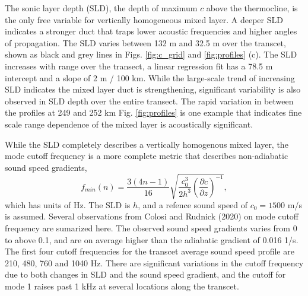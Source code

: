 \documentclass[preprint,NumberedRefs]{JASA}
\begin{document}
The sonic layer depth (SLD), the depth of maximum $c$ above the thermocline, is the only free variable for vertically homogeneous mixed layer. A deeper SLD indicates a stronger duct that traps lower acoustic frequencies and higher angles of propagation. The SLD varies between 132 m and 32.5 m over the transcet, shown as black and grey lines in Figs. \ref{fig:c_grid} and \ref{fig:profiles} (c). The SLD increases with range over the transect, a linear regression fit has a 78.5 m intercept and a slope of 2 m / 100 km. While the large-scale trend of increasing SLD indicates the mixed layer duct is strengthening, significant variability is also observed in SLD depth over the entire transect. The rapid variation in between the profiles at 249 and 252 km Fig. \ref{fig:profiles} is one example that indicates fine scale range dependence of the mixed layer is acoustically significant.

While the SLD completely describes a vertically homogenous mixed layer, the mode cutoff frequency\citep{Urick1982Prop} is a more complete metric that describes non-adiabatic sound speed gradients,
\begin{equation}
    f_{min}(n) = \frac{3(4n-1)}{16} \sqrt{\frac{c_0^3}{2h^3} \left( \frac{\partial c}{\partial z} \right) ^ {-1}},
    \label{eq:f_cutoff}
\end{equation}
which has units of Hz. The SLD is $h$, and a refence sound speed of $c_0 = 1500$ m/s is assumed. Several observations from Colosi and Rudnick (2020)\cite{colosi2020observations} on mode cutoff frequency are sumarized here. The observed sound speed gradients varies from 0 to above 0.1, and are on average higher than the adiabatic gradient of 0.016 1/s. The first four cutoff frequencies for the transcet average sound speed profile are 210, 480, 760 and 1040 Hz. There are significant variations in the cutoff frequency due to both changes in SLD and the sound speed gradient, and the cutoff for mode 1 raises past 1 kHz at several locations along the transcet.
\end{document}
